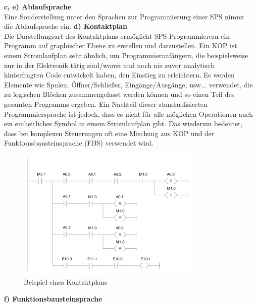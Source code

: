 	
	
	\textbf{c, e) Ablaufsprache}\\
	
	Eine Sonderstellung unter den Sprachen zur Programmierung einer SPS nimmt die Ablaufsprache ein.
	\textbf{d) Kontaktplan}\\
	Die Darstellungsart des Kontaktplans ermöglicht SPS-Programmierern ein Programm auf graphischer Ebene zu erstellen und darzustellen. Ein KOP ist einem Stromlaufplan sehr ähnlich, um Programmieranfängern, die beispielsweise nur in der Elektronik tätig sind/waren und noch nie zuvor analytisch hinterfragten Code entwickelt haben, den Einstieg zu erleichtern. Es werden Elemente wie Spulen, Öffner/Schließer, Eingänge/Ausgänge, usw... verwendet, die zu logischen Blöcken zusammengefasst werden können und so einen Teil des gesamten Programms ergeben. Ein Nachteil dieser standardisierten Programmiersprache ist jedoch, dass es nicht für alle möglichen Operationen auch ein einheitliches Symbol in einem Stromlaufplan gibt. Das wiederum bedeutet, dass bei komplexen Steuerungen oft eine Mischung aus KOP und der Funktionsbausteinsprache (FBS) verwendet wird.
	\begin{figure}[h!]
  		\centering
    	\includegraphics[width=0.8\textwidth]{graphics/stateoftheart/kop_Selfmade.png}
  		\caption{Beispiel eines Kontaktplans \cite{kontaktplan}}
	\end{figure}

	\newpage
	\textbf{f) Funktionsbausteinsprache}\\

